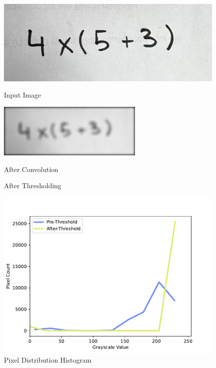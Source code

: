 \documentclass[@CLASSOPTIONS@]{tumarticle}
\begin{document}
\begin{figure}[!htb]
    \vspace{0.3cm}
   \begin{minipage}{0.48\textwidth}
     \centering
     \includegraphics[width=.6\linewidth]{figures/real_data_1}
     \caption{Input Image}\label{Fig:Data3}
   \end{minipage}\hfill
   \vspace{0.3cm}
   \begin{minipage}{0.48\textwidth}
     \centering
     \includegraphics[width=.6\linewidth]{figures/convolve}
     \caption{After Convolution}\label{Fig:Data4_1}
   \end{minipage}
      \vspace{0.3cm}

   \begin{minipage}{0.48\textwidth}
     \centering
     \caption{After Thresholding}\label{Fig:Data4}
   \end{minipage}
  \hfill
   \begin{minipage}{0.48\textwidth}
     \centering
     \includegraphics[width=.9\linewidth]{figures/histogram}
     \caption{Pixel Distribution Histogram}\label{Fig:Data5}
   \end{minipage}
\end{figure}
\end{document}
